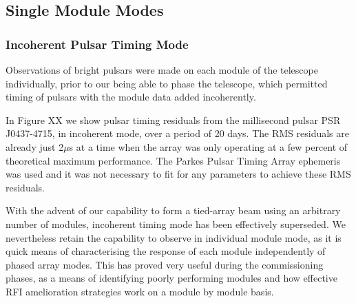 \subsection{Single Module Modes}
\subsubsection{Incoherent Pulsar Timing Mode}

Observations of bright pulsars were made on each module of the telescope individually, prior to our being able to phase the telescope, which permitted timing of pulsars with the module data added incoherently. 

In Figure XX we show pulsar timing residuals from the millisecond pulsar PSR J0437-4715, in incoherent mode, over a period of 20 days. The RMS residuals are already just 2$\mu$s at a time when the array was only operating at a few percent of theoretical maximum performance. The Parkes Pulsar Timing Array ephemeris was used and it was not necessary to fit for any parameters to achieve these RMS residuals.

With the advent of our capability to form a tied-array beam using an arbitrary number of modules, incoherent timing mode has been effectively superseded. We nevertheless retain the capability to observe in individual module mode, as it is quick means of characterising the response of each module independently of phased array modes. This has proved very useful during the commissioning phases, as a means of identifying poorly performing modules and how effective RFI amelioration strategies work on a module by module basis.     



  